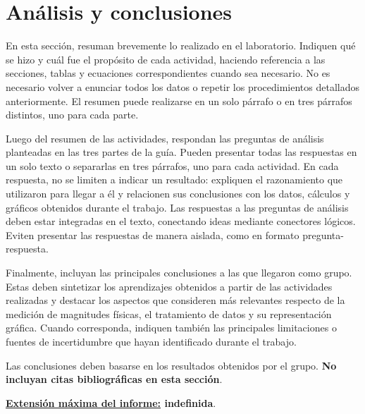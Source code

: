 \section{Análisis y conclusiones}

En esta sección, resuman brevemente lo realizado en el laboratorio. Indiquen qué se hizo y cuál fue el propósito de cada actividad, haciendo referencia a las secciones, tablas y ecuaciones correspondientes cuando sea necesario. No es necesario volver a enunciar todos los datos o repetir los procedimientos detallados anteriormente. El resumen puede realizarse en un solo párrafo o en tres párrafos distintos, uno para cada parte.

Luego del resumen de las actividades, respondan las preguntas de análisis planteadas en las tres partes de la guía. Pueden presentar todas las respuestas en un solo texto o separarlas en tres párrafos, uno para cada actividad. En cada respuesta, no se limiten a indicar un resultado: expliquen el razonamiento que utilizaron para llegar a él y relacionen sus conclusiones con los datos, cálculos y gráficos obtenidos durante el trabajo. Las respuestas a las preguntas de análisis deben estar integradas en el texto, conectando ideas mediante conectores lógicos. Eviten presentar las respuestas de manera aislada, como en formato pregunta-respuesta.

Finalmente, incluyan las principales conclusiones a las que llegaron como grupo. Estas deben sintetizar los aprendizajes obtenidos a partir de las actividades realizadas y destacar los aspectos que consideren más relevantes respecto de la medición de magnitudes físicas, el tratamiento de datos y su representación gráfica. Cuando corresponda, indiquen también las principales limitaciones o fuentes de incertidumbre que hayan identificado durante el trabajo.

Las conclusiones deben basarse en los resultados obtenidos por el grupo. \textbf{No incluyan citas bibliográficas en esta sección}.

\textbf{\underline{Extensión máxima del informe:} indefinida}.
